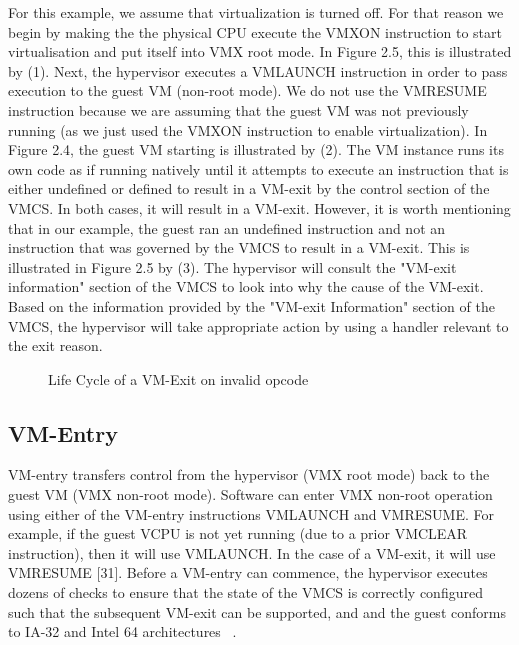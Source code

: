 \documentclass{report}
\begin{document}
\begin{spacing}{1.5}
{\large
For this example, we assume that virtualization is turned off. For that reason we begin by making the the physical CPU execute the VMXON instruction to start virtualisation and put itself into VMX root mode. In Figure 2.5, this is illustrated by (1). Next, the hypervisor executes a VMLAUNCH instruction in order to pass execution to the guest VM (non-root mode). We do not use the VMRESUME instruction because we are assuming that the guest VM was not previously running (as we just used the VMXON instruction to enable virtualization). In Figure 2.4, the guest VM starting is illustrated by (2). The VM instance runs its own code as if running natively until it attempts to execute an instruction that is either undefined or defined to result in a VM-exit by the control section of the VMCS. In both cases, it will result in a VM-exit. However, it is worth mentioning that in our example, the guest ran an undefined instruction and not an instruction that was governed by the VMCS to result in a VM-exit. This is illustrated in Figure 2.5 by (3). The hypervisor will consult the "VM-exit information" section of the VMCS to look into why the cause of the VM-exit. Based on the information provided by the "VM-exit Information" section of the VMCS, the hypervisor will take appropriate action by using a handler relevant to the exit reason.
\newline
}




\newpage
\vfill
{}
\begin{figure}[ht]
    \centering
    \caption{Life Cycle of a VM-Exit on invalid opcode}
\end{figure}



\subsection{VM-Entry}
{\large
VM-entry transfers control from the hypervisor (VMX root mode) back to the guest VM (VMX non-root mode). Software can enter VMX non-root operation using either of the VM-entry instructions VMLAUNCH and VMRESUME. For example, if the guest VCPU is not yet running (due to a prior VMCLEAR instruction), then it will use VMLAUNCH. In the case of a VM-exit, it will use VMRESUME [31]. Before a VM-entry can commence, the hypervisor executes dozens of checks to ensure that the state of the VMCS is correctly configured such that the subsequent VM-exit can be supported, and and the guest conforms to IA-32 and Intel 64 architectures ~\cite{goto2011kernel}.
\newline
}


\end{spacing}
\end{document}
